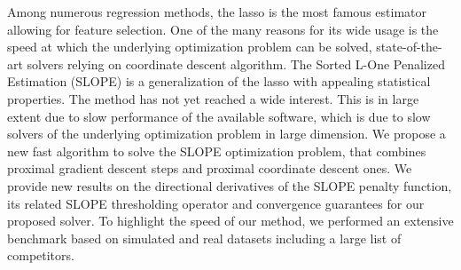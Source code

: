 Among numerous regression methods, the lasso is the most famous estimator allowing for feature selection. %
One of the many reasons for its wide usage is the speed at which the underlying optimization problem can be solved, state-of-the-art solvers relying on coordinate descent algorithm.
The Sorted L-One Penalized Estimation (SLOPE) is a generalization of the lasso with appealing statistical properties. The method has not yet reached a wide interest. This is in large extent due to slow performance of the available software, which is due to slow solvers of the underlying optimization problem in large dimension.
We propose a new fast algorithm to solve the SLOPE optimization problem,
that combines proximal gradient descent steps and proximal coordinate descent ones.
We provide new results on the directional derivatives of the SLOPE penalty function, its related SLOPE thresholding operator and convergence guarantees for our proposed solver.
To highlight the speed of our method, we performed an extensive benchmark based on simulated and real datasets including a large list of competitors.

